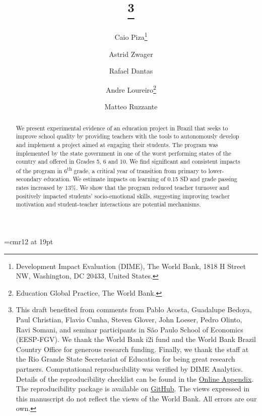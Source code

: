 \documentclass[11pt,a4paper]{article}
\begin{document}
	
	
	\font\myfont=cmr12 at 19pt
	\title{\thanks{This draft benefited from comments from Pablo Acosta, Guadalupe Bedoya, Paul Christian, Flavio Cunha, Steven Glover, John Loeser, Pedro Olinto, Ravi Somani, and seminar participants in São Paulo School of Economics (EESP-FGV). We thank the World Bank i2i fund and the World Bank Brazil Country Office for generous  research  funding. Finally, we thank the staff at the Rio Grande State Secretariat of Education for being great research partners. Computational reproducibility was verified by DIME Analytics. Details of the reproducibility checklist can be found in the \href{https://github.com/worldbank/brazil-pip-education/pip_app.pdf}{Online Appendix}. The reproducibility package is available on \href{https://github.com/worldbank/brazil-pip-education}{GitHub}. The views expressed in this manuscript do not reflect the views of the World Bank. All errors are our own.}}
	
	\newcommand*\samethanks[1][\value{footnote}]{\footnotemark[#1]}
	
	\author{%
		Caio Piza\thanks{Development Impact Evaluation (DIME), The World Bank, 1818 H Street NW, Washington, DC 20433, United States.}%
		\and Astrid Zwager\samethanks[2]%
		\and Rafael Dantas\samethanks[2]%
		\and Andre Loureiro\thanks{Education Global Practice, The World Bank.}%
		\and Matteo Ruzzante\samethanks[2]
	}
	
	
	\date{}
	
	\maketitle
	
	\begin{abstract}
		\noindent We present experimental evidence of an education project in Brazil that seeks to improve school quality by providing teachers with the tools to autonomously develop and implement a project aimed at engaging their students. The program was implemented by the state government in one of the worst performing states of the country and offered in Grades 5, 6 and 10. We find significant and consistent impacts of the program in 6\textsuperscript{th} grade, a critical year of transition from primary to lower-secondary education. We estimate impacts on learning of 0.15 SD and grade passing rates increased by 13\%. We show that the program reduced teacher turnover and positively impacted students' socio-emotional skills, suggesting improving teacher motivation and student-teacher interactions are potential mechanisms.   
	\end{abstract}
	
\end{document}
